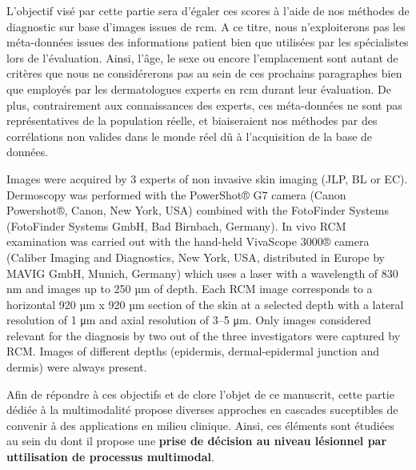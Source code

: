 L'objectif visé par cette partie sera d'égaler ces scores à l'aide de nos méthodes de diagnostic sur base d'images issues de \gls{rcm}. A ce titre, nous n'exploiterons pas les méta-données issues des informations patient bien que utilisées par les spécialistes lors de l'évaluation. Ainsi, l'âge, le sexe ou encore l'emplacement sont autant de critères que nous ne considérerons pas au sein de ces prochains paragraphes bien que employés par les dermatologues experts en \gls{rcm} durant leur évaluation. De plus, contrairement aux connaissances des experts, ces méta-données ne sont pas représentatives de la population réelle, et biaiseraient nos méthodes par des corrélations non valides dans le monde réel dû à l'acquisition de la base de données.\par

Images were acquired by 3 experts of non invasive skin imaging (JLP, BL or EC). Dermoscopy was performed with the PowerShot® G7 camera (Canon Powershot®, Canon, New York, USA) combined with the FotoFinder Systems (FotoFinder Systems GmbH, Bad Birnbach, Germany). In vivo RCM examination was carried out with the hand-held VivaScope 3000® camera (Caliber Imaging and Diagnostics, New York, USA, distributed in Europe by MAVIG GmbH, Munich, Germany) which uses a laser with a wavelength of 830 nm and images up to 250 µm of depth. Each RCM image corresponds to a horizontal 920 µm x 920 µm section of the skin at a selected depth with a lateral resolution of 1 μm and axial resolution of 3–5 μm. Only images considered relevant for the diagnosis by two out of the three investigators were captured by RCM. Images of different depths (epidermis, dermal-epidermal junction and dermis) were always present.

Afin de répondre à ces objectifs et de clore l'objet de ce manuscrit, cette partie dédiée à la multimodalité propose diverses approches en cascades suceptibles de convenir à des applications en milieu clinique. Ainsi, ces éléments sont étudiées au sein du  dont il propose une \textbf{prise de décision au niveau lésionnel par uttilisation de processus multimodal}.\par